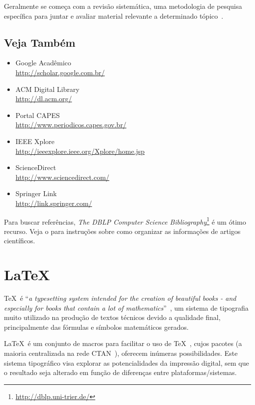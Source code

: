 Geralmente se começa com a revisão sistemática, uma metodologia de pesquisa
específica para juntar e avaliar material relevante a determinado tópico~\cite{Biolchini_2005_Systematicreviewin}.

\subsection{Veja Também}
\begin{itemize}
	\item Google Acadêmico
		\\\url{http://scholar.google.com.br/}%
	\item ACM Digital Library
		\\\url{http://dl.acm.org/}%
	\item Portal \acrshort{CAPES}
		\\\url{http://www.periodicos.capes.gov.br/}%
	\item IEEE Xplore
		\\\url{http://ieeexplore.ieee.org/Xplore/home.jsp}%
	\item ScienceDirect
		\\\url{http://www.sciencedirect.com/}%
	\item Springer Link
		\\\url{http://link.springer.com/}%
\end{itemize}

Para buscar referências, \emph{The DBLP Computer Science Bibliography}\footnote{\url{http://dblp.uni-trier.de/}}
é um ótimo recurso. Veja o  para instruções
sobre como organizar as informações de artigos científicos.


\section{\LaTeX}%

\TeX\ é ``\emph{a typesetting system intended for the creation of beautiful books
 - and especially for books that contain a lot of mathematics}''~\cite{Knuth_1986_texbook},
 um sistema de tipografia muito utilizado na produção de textos técnicos devido
 a qualidade final, principalmente das fórmulas e símbolos matemáticos gerados.

\LaTeX\ é um conjunto de macros para facilitar o uso de \TeX~\cite{lamport_latex:_1994},
cujos pacotes (a maioria centralizada na rede \acrshort{CTAN}~\cite{greenwade93}), oferecem
inúmeras possibilidades. Este sistema tipográfico visa explorar as potencialidades
da impressão digital, sem que o resultado seja alterado em função de diferenças
entre plataformas/sistemas.

